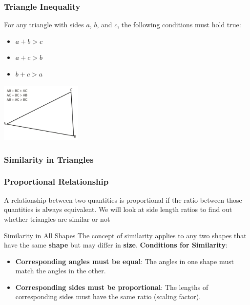 \documentclass{beamer}
\begin{document}
\begin{frame}
    \frametitle{Triangle Inequality}
    \begin{block}{}
        For any triangle with sides \(a\), \(b\), and \(c\), the following conditions must hold true:
         \begin{itemize}
                \item \( a + b > c \)
                \item \( a + c > b \)
                \item \( b + c > a \)
        \end{itemize}
    \end{block}
    \begin{center}
        \includegraphics[width=0.3\textwidth]{triangle_inequality.jpeg} 
    \end{center}
\end{frame}

\begin{frame}
    \frametitle{Similarity in Triangles}
\end{frame}



\begin{frame}
    \frametitle{Proportional Relationship}
    A relationship between two quantities is proportional if the ratio between those quantities is always equivalent. We will look at side length ratios to find out whether triangles are similar or not
\end{frame}

\begin{frame}{Similarity in All Shapes}
  The concept of similarity applies to any two shapes that have the same \textbf{shape} but may differ in \textbf{size}.
    \vspace{10pt}
    \textbf{Conditions for Similarity}:
    \begin{itemize}
        \item \textbf{Corresponding angles must be equal}: The angles in one shape must match the angles in the other.
        \item \textbf{Corresponding sides must be proportional}: The lengths of corresponding sides must have the same ratio (scaling factor).
    \end{itemize}
\end{frame}
\end{document}
